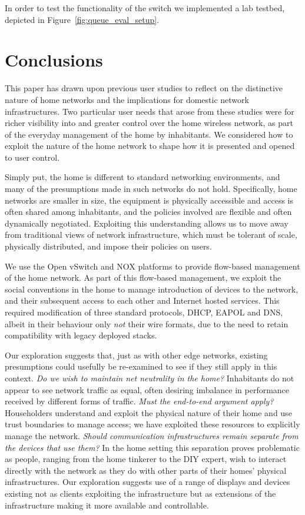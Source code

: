 In order to test the functionality of the switch we implemented a lab testbed, 
depicted in Figure~\ref{fig:queue_eval_setup}.

\section{Conclusions} \label{sec:conclusion}

This paper has drawn upon previous user studies to reflect on the distinctive
nature of home networks and the implications for domestic network
infrastructures.  Two particular user needs that arose from these studies were
for richer visibility into and greater control over the home wireless network,
as part of the everyday management of the home by inhabitants.  We  considered
how to exploit the nature of the home network to shape how it is presented and
opened to user control.  

Simply put, the home is different to standard networking environments, and
many of the presumptions made in such networks do not hold.  Specifically,
home networks are smaller in size, the equipment is physically accessible and
access is often shared among inhabitants, and the policies involved are
flexible and often dynamically negotiated.  Exploiting this understanding
allows us to move away from traditional views of network infrastructure, which
must be tolerant of scale, physically distributed, and impose their policies
on users. 

We use the Open vSwitch and NOX platforms to provide flow-based management of
the home network.  As part of this flow-based management, we exploit the
social conventions in the home to manage introduction of devices  to the
network, and their subsequent access to each other and Internet hosted
services.  This required modification of three standard protocols, DHCP, EAPOL
and DNS, albeit in their behaviour only \emph{not} their wire formats, due to
the need to retain compatibility with legacy deployed stacks.
                                                         
Our exploration suggests that, just as with other edge networks, existing
presumptions could usefully be re-examined to see if they still apply in this
context.  \emph{Do we wish to maintain net neutrality in the home?}
Inhabitants do not appear to see network traffic as equal, often desiring
imbalance in performance received by different forms of traffic.  \emph{Must
the end-to-end argument apply?} Householders understand and exploit the
physical nature of their home and use trust boundaries to manage access; we
have exploited these resources to explicitly manage the network.  \emph{Should
communication infrastructures remain separate from the devices that use them?}
In the home setting this separation proves problematic as people, ranging from
the home tinkerer to the DIY expert, wish to interact directly with the
network as they do with other parts of their homes' physical infrastructures.
Our exploration suggests use of a range of displays and devices existing not
as clients exploiting the infrastructure but as extensions of the
infrastructure making it more available and controllable.

